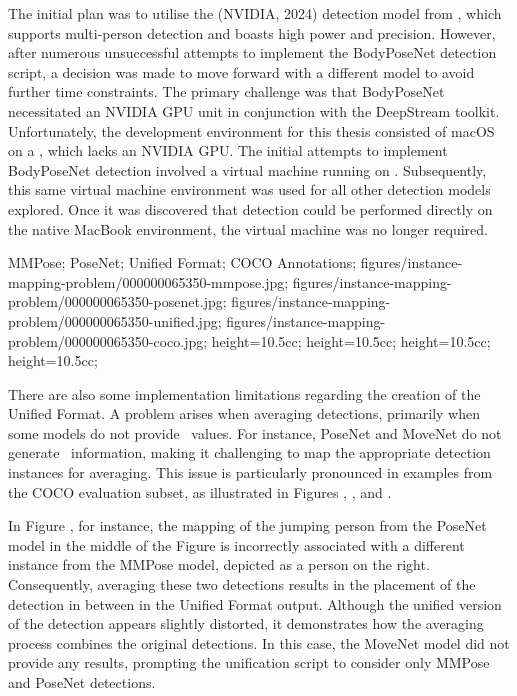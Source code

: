 The initial plan was to utilise the  (NVIDIA, 2024) detection model from , which supports multi-person detection and boasts high power and precision. However, after numerous unsuccessful attempts to implement the BodyPoseNet detection script, a decision was made to move forward with a different model to avoid further time constraints. The primary challenge was that BodyPoseNet necessitated an NVIDIA GPU unit in conjunction with the DeepStream toolkit. Unfortunately, the development environment for this thesis consisted of macOS  on a , which lacks an NVIDIA GPU. The initial attempts to implement BodyPoseNet detection involved a virtual machine running  on . Subsequently, this same virtual machine environment was used for all other detection models explored. Once it was discovered that detection could be performed directly on the native MacBook environment, the virtual machine was no longer required.

 {
 MMPose;
 PoseNet;
 Unified Format;
 COCO Annotations;
 }
 {
 figures/instance-mapping-problem/000000065350-mmpose.jpg;
 figures/instance-mapping-problem/000000065350-posenet.jpg;
 figures/instance-mapping-problem/000000065350-unified.jpg;
 figures/instance-mapping-problem/000000065350-coco.jpg;
 }
 {
 height=10.5cc;
 height=10.5cc;
 height=10.5cc;
 height=10.5cc;
 }

There are also some implementation limitations regarding the creation of the Unified Format. A problem arises when averaging detections, primarily when some models do not provide \BBOX\ values. For instance, PoseNet and MoveNet do not generate \BBOX\ information, making it challenging to map the appropriate detection instances for averaging. This issue is particularly pronounced in examples from the COCO evaluation subset, as illustrated in Figures , , and .

In Figure , for instance, the mapping of the jumping person from the PoseNet model in the middle of the Figure is incorrectly associated with a different instance from the MMPose model, depicted as a person on the right. Consequently, averaging these two detections results in the placement of the detection in between in the Unified Format output. Although the unified version of the detection appears slightly distorted, it demonstrates how the averaging process combines the original detections. In this case, the MoveNet model did not provide any results, prompting the unification script to consider only MMPose and PoseNet detections.


